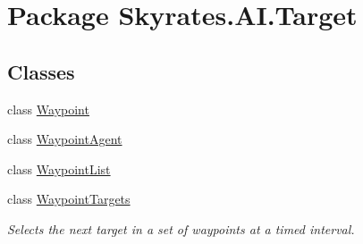 \hypertarget{namespace_skyrates_1_1_a_i_1_1_target}{\section{Package Skyrates.\-A\-I.\-Target}
\label{namespace_skyrates_1_1_a_i_1_1_target}
}
\subsection*{Classes}
\begin{DoxyCompactItemize}
\item 
class \hyperlink{class_skyrates_1_1_a_i_1_1_target_1_1_waypoint}{Waypoint}
\item 
class \hyperlink{class_skyrates_1_1_a_i_1_1_target_1_1_waypoint_agent}{Waypoint\-Agent}
\item 
class \hyperlink{class_skyrates_1_1_a_i_1_1_target_1_1_waypoint_list}{Waypoint\-List}
\item 
class \hyperlink{class_skyrates_1_1_a_i_1_1_target_1_1_waypoint_targets}{Waypoint\-Targets}
\begin{DoxyCompactList}\small\item\em Selects the next target in a set of waypoints at a timed interval. \end{DoxyCompactList}\end{DoxyCompactItemize}
